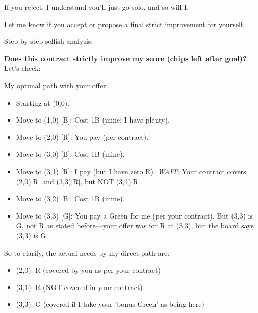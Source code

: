 \documentclass{article} %
\begin{document}
\begin{redbox}[P-Red]
\vspace{0.5em}

If you reject, I understand you'll just go solo, and so will I.  

\vspace{0.5em}

Let me know if you accept or propose a final strict improvement for yourself.
\end{redbox}

\begin{bluebox}[P-Blue]
Step-by-step selfish analysis:

\vspace{0.5em}

\textbf{Does this contract strictly improve my score (chips left after goal)?}
Let's check:

\vspace{0.5em}

My optimal path with your offer:
\begin{itemize}
  \item Starting at (0,0).
  \item Move to (1,0) [B]: Cost 1B (mine: I have plenty).
  \item Move to (2,0) [R]: You pay (per contract).
  \item Move to (3,0) [B]: Cost 1B (mine).
  \item Move to (3,1) [R]: I pay (but I have zero R). \textit{WAIT}: Your contract covers (2,0)[R] and (3,3)[R], but NOT (3,1)[R].
  \item Move to (3,2) [B]: Cost 1B (mine).
  \item Move to (3,3) [G]: You pay a Green for me (per your contract). But (3,3) is G, not R as stated before—your offer was for R at (3,3), but the board says (3,3) is G.
\end{itemize}

\vspace{0.5em}

So to clarify, the actual needs by my direct path are:
\begin{itemize}
  \item (2,0): R (covered by you as per your contract)
  \item (3,1): R (NOT covered in your contract)
  \item (3,3): G (covered if I take your 'bonus Green' as being here)
\end{itemize}

\vspace{0.5em}


\end{bluebox}
\end{document}

